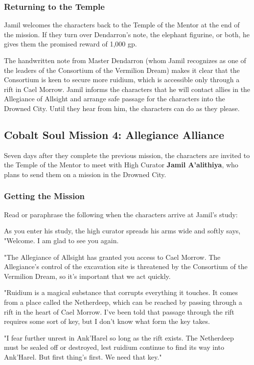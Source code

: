 \documentclass[10pt,a4paper,twoside,bg=print,twocolumn,openany,nodeprecatedcode]{dndbook}
\begin{document}
\subsubsection{Returning to the Temple}
Jamil welcomes the characters back to the Temple of the Mentor at the end of the mission. If they turn over Dendarron's note, the elephant figurine, or both, he gives them the promised reward of 1,000 gp.

The handwritten note from Master Dendarron (whom Jamil recognizes as one of the leaders of the Consortium of the Vermilion Dream) makes it clear that the Consortium is keen to secure more ruidium, which is accessible only through a rift in Cael Morrow. Jamil informs the characters that he will contact allies in the Allegiance of Allsight and arrange safe passage for the characters into the Drowned City. Until they hear from him, the characters can do as they please.

\subsection{Cobalt Soul Mission 4: Allegiance Alliance}
Seven days after they complete the previous mission, the characters are invited to the Temple of the Mentor to meet with High Curator \textbf{Jamil A'alithiya}, who plans to send them on a mission in the Drowned City.

\subsubsection{Getting the Mission}
Read or paraphrase the following when the characters arrive at Jamil's study:

\begin{DndReadAloud}{}
As you enter his study, the high curator spreads his arms wide and softly says, "Welcome. I am glad to see you again.

"The Allegiance of Allsight has granted you access to Cael Morrow. The Allegiance's control of the excavation site is threatened by the Consortium of the Vermilion Dream, so it's important that we act quickly.

"Ruidium is a magical substance that corrupts everything it touches. It comes from a place called the Netherdeep, which can be reached by passing through a rift in the heart of Cael Morrow. I've been told that passage through the rift requires some sort of key, but I don't know what form the key takes.

"I fear further unrest in Ank'Harel so long as the rift exists. The Netherdeep must be sealed off or destroyed, lest ruidium continue to find its way into Ank'Harel. But first thing's first. We need that key."

\end{DndReadAloud}
\end{document}

